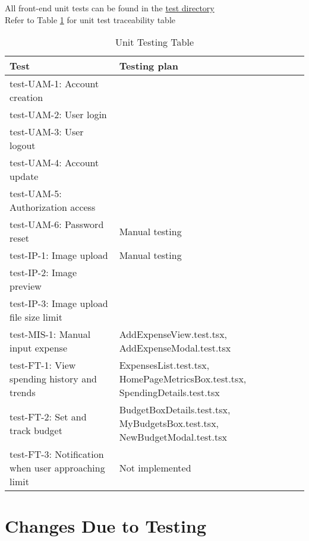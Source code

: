 \documentclass[12pt, titlepage]{article}
\begin{document}
All front-end unit tests can be found in the \href{https://github.com/PlutosCapstone/Plutos/tree/main/src/client/tests}{test directory}\\
Refer to Table \ref{tab:unit-testing} for unit test traceability table

\begin{table}[h]
  \centering
  \renewcommand{\arraystretch}{1.3}
  \begin{tabular}{| m{5cm} | m{8cm} |}
      \hline
      \textbf{Test} & \textbf{Testing plan} \\
      \hline
      test-UAM-1: Account creation &  \\
      \hline
      test-UAM-2: User login &  \\
      \hline
      test-UAM-3: User logout &  \\
      \hline
      test-UAM-4: Account update &  \\
      \hline
      test-UAM-5: Authorization access &  \\
      \hline
      test-UAM-6: Password reset & Manual testing \\
      \hline
      test-IP-1: Image upload & Manual testing \\
      \hline
      test-IP-2: Image preview &  \\
      \hline
      test-IP-3: Image upload file size limit &  \\
      \hline
      test-MIS-1: Manual input expense & AddExpenseView.test.tsx, AddExpenseModal.test.tsx \\
      \hline
      test-FT-1: View spending history and trends & ExpensesList.test.tsx, HomePageMetricsBox.test.tsx, SpendingDetails.test.tsx \\
      \hline
      test-FT-2: Set and track budget & BudgetBoxDetails.test.tsx, MyBudgetsBox.test.tsx, NewBudgetModal.test.tsx \\
      \hline
      test-FT-3: Notification when user approaching limit & Not implemented \\
      \hline
  \end{tabular}
  \caption{Unit Testing Table} \label{tab:unit-testing}
\end{table}


\section{Changes Due to Testing}

\end{document}
